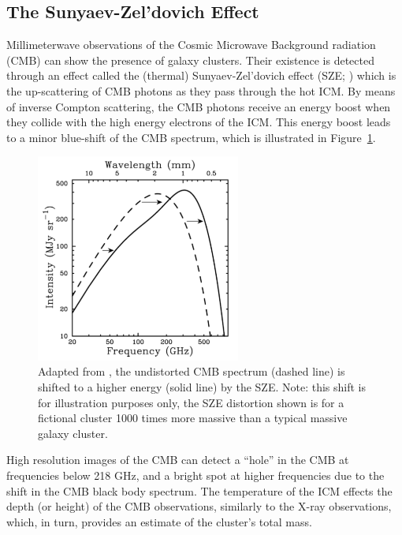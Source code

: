 \subsection{The Sunyaev-Zel'dovich Effect}
Millimeterwave observations of the Cosmic Microwave Background radiation (CMB) can show the presence of galaxy clusters. Their existence is detected through an effect called the (thermal) Sunyaev-Zel'dovich effect (SZE; \citealt{Sunyaev1972}) which is the up-scattering of CMB photons as they pass through the hot ICM. By means of inverse Compton scattering, the CMB photons receive an energy boost when they collide with the high energy electrons of the ICM. This energy boost leads to a minor blue-shift of the CMB spectrum, which is illustrated in Figure~\ref{fig:sze}. 
\begin{figure}[ht]
	\begin{center}
		\includegraphics[width=0.6\textwidth]{figures/sze.pdf}
	\end{center}
	\caption[The Sunyaev-Zel'dovich Effect.]{Adapted from \cite{Carlstrom2002a}, the undistorted CMB spectrum (dashed line) is shifted to a higher energy (solid line) by the SZE. Note: this shift is for illustration purposes only, the SZE distortion shown is for a fictional cluster 1000 times more massive than a typical massive galaxy cluster.}
	\label{fig:sze}
\end{figure}
High resolution images of the CMB can detect a ``hole'' in the CMB at frequencies below 218 GHz, and a bright spot at higher frequencies due to the shift in the CMB black body spectrum. The temperature of the ICM effects the depth (or height) of the CMB observations, similarly to the X-ray observations, which, in turn, provides an estimate of the cluster's total mass. 

